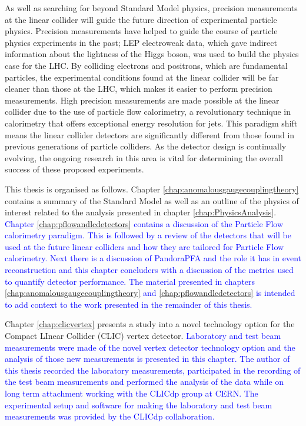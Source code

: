 As well as searching for beyond Standard Model physics, precision measurements at the linear collider will guide the future direction of experimental particle physics.  Precision measurements have helped to guide the course of particle physics experiments in the past; LEP electroweak data, which gave indirect information about the lightness of the Higgs boson, was used to build the physics case for the LHC.  By colliding electrons and positrons, which are fundamental particles, the experimental conditions found at the linear collider will be far cleaner than those at the LHC, which makes it easier to perform precision measurements.  High precision measurements are made possible at the linear collider due to the use of particle flow calorimetry, a revolutionary technique in calorimetry that offers exceptional energy resolution for jets.  This paradigm shift means the linear collider detectors are significantly different from those found in previous generations of particle colliders.  As the detector design is continually evolving, the ongoing research in this area is vital for determining the overall success of these proposed experiments.  

This thesis is organised as follows.  Chapter \ref{chap:anomalousgaugecouplingtheory} contains a summary of the Standard Model as well as an outline of the physics of interest related to the analysis presented in chapter \ref{chap:PhysicsAnalysis}.  \textcolor{blue}{Chapter \ref{chap:pflowandlcdetectors} contains a discussion of the Particle Flow calorimetry paradigm.  This is followed by a review of the detectors that will be used at the future linear colliders and how they are tailored for Particle Flow calorimetry.  Next there is a discussion of PandoraPFA and the role it has in event reconstruction and this chapter concluders with a discussion of the metrics used to quantify detector performance.  The material presented in chapters \ref{chap:anomalousgaugecouplingtheory} and \ref{chap:pflowandlcdetectors} is intended to add context to the work presented in the remainder of this thesis.}

Chapter \ref{chap:clicvertex} presents a study into a novel technology option for the Compact LInear Collider (CLIC) vertex detector.  \textcolor{blue}{Laboratory and test beam measurements were made of the novel vertex detector technology option and the analysis of those new measurements is presented in this chapter.  The author of this thesis recorded the laboratory measurements, participated in the recording of the test beam measurements and performed the analysis of the data while on long term attachment working with the CLICdp group at CERN.  The experimental setup and software for making the laboratory and test beam measurements was provided by the CLICdp collaboration.}

